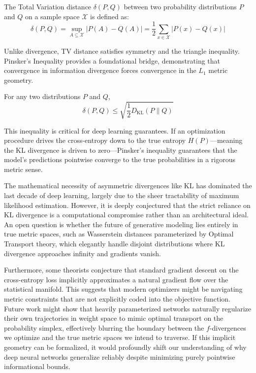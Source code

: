 \begin{definition}
The Total Variation distance $\delta(P, Q)$ between two probability distributions $P$ and $Q$ on a sample space $\mathcal{X}$ is defined as:
\begin{equation}
\delta(P, Q) = \sup_{A \subseteq \mathcal{X}} |P(A) - Q(A)| = \frac{1}{2}\sum_{x \in \mathcal{X}} |P(x) - Q(x)|
\end{equation}
\end{definition}

Unlike divergence, TV distance satisfies symmetry and the triangle inequality. Pinsker's Inequality provides a foundational bridge, demonstrating that convergence in information divergence forces convergence in the $L_1$ metric geometry.

\begin{theorem}
For any two distributions $P$ and $Q$,
\begin{equation}
\delta(P, Q) \le \sqrt{\frac{1}{2} D_{\text{KL}}(P \parallel Q)}
\end{equation}
\end{theorem}
This inequality is critical for deep learning guarantees. If an optimization procedure drives the cross-entropy down to the true entropy $H(P)$---meaning the KL divergence is driven to zero---Pinsker's inequality guarantees that the model's predictions pointwise converge to the true probabilities in a rigorous metric sense.

\begin{horizon}
The mathematical necessity of asymmetric divergences like KL has dominated the last decade of deep learning, largely due to the sheer tractability of maximum likelihood estimation. However, it is deeply conjectured that the strict reliance on KL divergence is a computational compromise rather than an architectural ideal. An open question is whether the future of generative modeling lies entirely in true metric spaces, such as Wasserstein distances parameterized by Optimal Transport theory, which elegantly handle disjoint distributions where KL divergence approaches infinity and gradients vanish.

Furthermore, some theorists conjecture that standard gradient descent on the cross-entropy loss implicitly approximates a natural gradient flow over the statistical manifold. This suggests that modern optimizers might be navigating metric constraints that are not explicitly coded into the objective function. Future work might show that heavily parameterized networks naturally regularize their own trajectories in weight space to mimic optimal transport on the probability simplex, effectively blurring the boundary between the $f$-divergences we optimize and the true metric spaces we intend to traverse. If this implicit geometry can be formalized, it would profoundly shift our understanding of why deep neural networks generalize reliably despite minimizing purely pointwise informational bounds.
\end{horizon}

